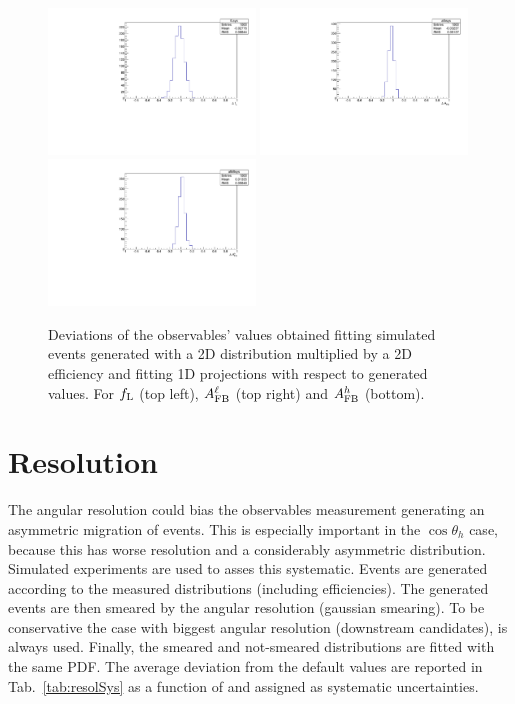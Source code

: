 \begin{figure}
\centering
\includegraphics[width=0.49\textwidth]{Lmumu/figs/fLsys_efficiency.pdf}
\includegraphics[width=0.49\textwidth]{Lmumu/figs/afbsys_efficiency.pdf}
\includegraphics[width=0.49\textwidth]{Lmumu/figs/afbBsys_efficiency.pdf}
\caption{Deviations of the observables' values obtained fitting simulated events
 generated with a 2D distribution multiplied by a 2D efficiency and fitting 1D projections
 with respect to generated values. For $f_{\rm L}$ (top left), 
 $A_{\rm FB}^\ell$ (top right) and $A_{\rm FB}^h$ (bottom). }
\label{fig:effBias}
\end{figure}




\section{Resolution}

The angular resolution could bias the observables measurement 
generating an asymmetric migration of events.
This is especially important in the $\cos \theta_h$ case, because this has worse resolution
and a considerably asymmetric distribution. Simulated experiments are used to asses this systematic.
Events are generated according to the measured distributions (including efficiencies).
The generated events are then smeared by the angular resolution (gaussian smearing).
To be conservative the case with biggest angular resolution (downstream candidates), is always used.
Finally, the smeared and not-smeared distributions are fitted with the same PDF.  
The average deviation from the default values are reported in Tab.~\ref{tab:resolSys}
as a function of \qsq and assigned as systematic uncertainties.

